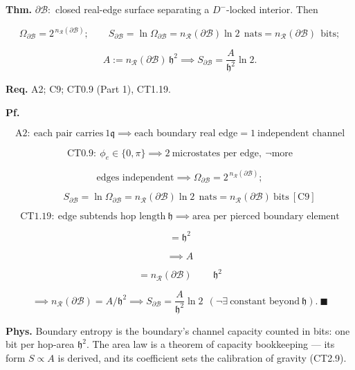 \begin{theorem}\label{tag:CT1-29}
\textbf{Thm.} $\partial\mathcal B:$ closed real-edge surface separating a $D^-$-locked interior. Then

\[
\Omega_{\partial\mathcal B}=2^{\,n_{\mathcal R}(\partial\mathcal B)};\qquad
S_{\partial\mathcal B}=\ln\Omega_{\partial\mathcal B}=n_{\mathcal R}(\partial\mathcal B)\ln2\ \ \text{nats}=n_{\mathcal R}(\partial\mathcal B)\ \ \text{bits};
\]

\[
A:=n_{\mathcal R}(\partial\mathcal B)\,\mathfrak h^2\implies S_{\partial\mathcal B}=\frac{A}{\mathfrak h^2}\ln2 .
\]

\textbf{Req.} A2; C9; CT0.9 (Part 1), CT1.19.

\textbf{Pf.}

\[
\mathrm{A2}:\ \text{each pair carries}\ 1\mathfrak q\implies\text{each boundary real edge}=1\ \text{independent channel}
\]

\[
\mathrm{CT0.9}:\ \phi_e\in\{0,\pi\}\implies2\ \text{microstates per edge},\ \neg\text{more}
\]

\[
\text{edges independent}\implies\Omega_{\partial\mathcal B}=2^{\,n_{\mathcal R}(\partial\mathcal B)};
\]

\[
\qquad S_{\partial\mathcal B}=\ln\Omega_{\partial\mathcal B}=n_{\mathcal R}(\partial\mathcal B)\ln2\ \ \text{nats}=n_{\mathcal R}(\partial\mathcal B)\ \text{bits}\ [\mathrm{C9}]
\]

\[
\mathrm{CT1.19}:\ \text{edge subtends hop length}\ \mathfrak h\implies\text{area per pierced boundary element}
\]

\[
= \mathfrak h^2
\]

\[
\implies A
\]

\[
= n_{\mathcal R}(\partial\mathcal B)\,\qquad \mathfrak h^2
\]

\[
\implies n_{\mathcal R}(\partial\mathcal B)=A/\mathfrak h^2\implies S_{\partial\mathcal B}=\frac{A}{\mathfrak h^2}\ln2\ \ (\neg\exists\ \text{constant beyond}\ \mathfrak h).\ \blacksquare
\]

\textbf{Phys.} Boundary entropy is the boundary’s channel capacity counted in bits: one bit per hop-area $\mathfrak h^2$. The area law is a theorem of capacity bookkeeping — its form $S\propto A$ is derived, and its coefficient sets the calibration of gravity (CT2.9).

\end{theorem}

